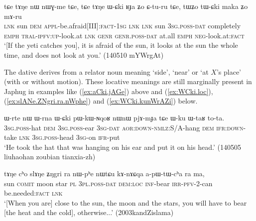 \begin{exe}
\ex \label{ex:WCki.Cturu}
\gll tɕe tɤŋe nɯ nɯɣ-me tɕe, tɕe tɤŋe ɯ-ɕki ʁɟa ʑo ɕ-tu-ru tɕe, tɯʑo tɯ-ɕki maka ʑo mɤ-ru \\
\textsc{lnk} sun \textsc{dem} \textsc{appl}-be.afraid[III]:\textsc{fact}-\textsc{1sg} \textsc{lnk} \textsc{lnk} sun \textsc{3sg}.\textsc{poss}-\textsc{dat} completely \textsc{emph} \textsc{tral}-\textsc{ipfv}:\textsc{up}-look.at \textsc{lnk} \textsc{genr} \textsc{genr}.\textsc{poss}-\textsc{dat} at.all \textsc{emph} \textsc{neg}-look.at:\textsc{fact} \\
\glt `[If the yeti catches you], it is afraid of the sun, it looks at the sun the whole time, and does not look at you.' (140510 mYWrgAt)
\end{exe}
 
The dative  derives from a relator noun meaning `side', `near' or `at $X$'s place' (with or without motion). These locative meanings are still marginally present in Japhug in examples like (\ref{ex:aCki.jAGe}) above and (\ref{ex:WCki.loc}), (\ref{ex:slANe.ZNgri.ra.nWphe}) and (\ref{ex:WCki.kunWrAZi}) below.

\begin{exe}
\ex \label{ex:WCki.loc}
\gll  ɯ-rte nɯ ɯ-rna ɯ-ɕki pɯ-kɯ-ɴqoʁ nɯnɯ pjɤ-mɟa tɕe ɯ-ku ɯ-taʁ to-ta. \\
\textsc{3sg}.\textsc{poss}-hat \textsc{dem} \textsc{3sg}.\textsc{poss}-ear \textsc{3sg}-\textsc{dat} \textsc{aor}:\textsc{down}-\textsc{nmlz}:S/A-hang \textsc{dem} \textsc{ifr}:\textsc{down}-take \textsc{lnk} \textsc{3sg}.\textsc{poss}-head \textsc{3sg}-on \textsc{ifr}-put \\
\glt `He took the hat that was hanging on his ear and put it on his head.' (140505 liuhaohan zoubian tianxia-zh)
\end{exe}

\begin{exe}
\ex \label{ex:slANe.ZNgri.ra.nWphe}
\gll   tɤŋe cʰo slɤŋe ʑŋgri ra nɯ-pʰe nɯtɕu kɤ-nɤɕqa a-pɯ-tɯ-cʰa ra ma, \\
sun \textsc{comit} moon star \textsc{pl} \textsc{3pl}.\textsc{poss}-\textsc{dat} \textsc{dem}:\textsc{loc} \textsc{inf}-bear \textsc{irr}-\textsc{pfv}-2-can be.needed:\textsc{fact} \textsc{lnk} \\
\glt `[When you are] close to the sun, the moon and the stars, you will have to bear [the heat and the cold], otherwise...' (2003kandZislama)
\end{exe}
 
